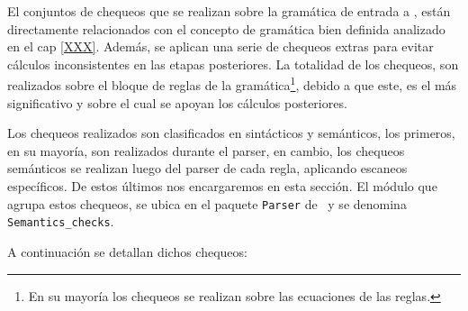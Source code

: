 El conjuntos de chequeos que se realizan sobre la gramática de entrada a \maggen, están directamente relacionados con el concepto de gramática bien definida analizado en el cap \ref{XXX}. Además, se aplican una serie de chequeos extras para evitar cálculos inconsistentes en las etapas posteriores. La totalidad de los chequeos, son realizados sobre el bloque de reglas de la gramática\footnote{En su mayoría los chequeos se realizan sobre las ecuaciones de las reglas.}, debido a que este, es el más significativo y sobre el cual se apoyan los cálculos posteriores.

Los chequeos realizados son clasificados en sintácticos y semánticos, los primeros, en su mayoría, son realizados durante el parser, en cambio, los chequeos semánticos se realizan luego del parser de cada regla, aplicando escaneos específicos. De estos últimos nos encargaremos en esta sección.
El módulo que agrupa estos chequeos, se ubica en el paquete \texttt{Parser} de \maggen\ y se denomina \texttt{Semantics\_checks}.

A continuación se detallan dichos chequeos:

